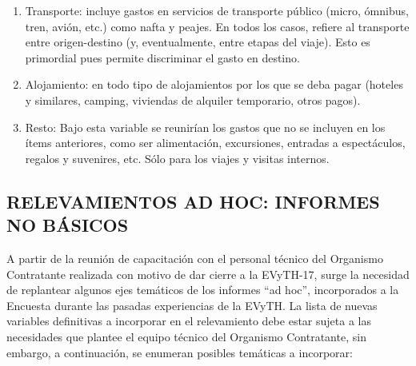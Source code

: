 \documentclass[
  openany]{book}
\providecommand{\tightlist}{%
  \setlength{\itemsep}{0pt}\setlength{\parskip}{0pt}}
\begin{document}
\begin{enumerate}
\def\labelenumi{\arabic{enumi})}
\tightlist
\item
  Transporte: incluye gastos en servicios de transporte público (micro, ómnibus, tren, avión, etc.) como nafta y peajes. En todos los casos, refiere al transporte entre origen-destino (y, eventualmente, entre etapas del viaje). Esto es primordial pues permite discriminar el gasto en destino.
\item
  Alojamiento: en todo tipo de alojamientos por los que se deba pagar (hoteles y similares, camping, viviendas de alquiler temporario, otros pagos).
\item
  Resto: Bajo esta variable se reunirían los gastos que no se incluyen en los ítems anteriores, como ser alimentación, excursiones, entradas a espectáculos, regalos y suvenires, etc. Sólo para los viajes y visitas internos.
\end{enumerate}

\hypertarget{relevamientos-ad-hoc-informes-no-buxe1sicos}{%
\subsection{\texorpdfstring{\textbf{RELEVAMIENTOS AD HOC: INFORMES NO BÁSICOS}}{RELEVAMIENTOS AD HOC: INFORMES NO BÁSICOS}}\label{relevamientos-ad-hoc-informes-no-buxe1sicos}}

A partir de la reunión de capacitación con el personal técnico del Organismo Contratante realizada con motivo de dar cierre a la EVyTH-17, surge la necesidad de replantear algunos ejes temáticos de los informes ``ad hoc'', incorporados a la Encuesta durante las pasadas experiencias de la EVyTH.
La lista de nuevas variables definitivas a incorporar en el relevamiento debe estar sujeta a las necesidades que plantee el equipo técnico del Organismo Contratante, sin embargo, a continuación, se enumeran posibles temáticas a incorporar:
\end{document}
